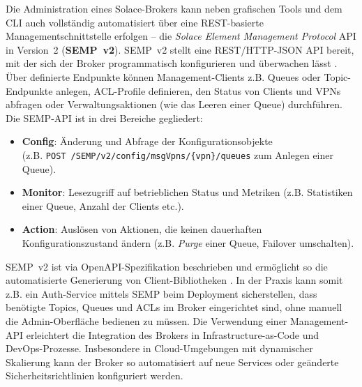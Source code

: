Die Administration eines Solace-Brokers kann neben grafischen Tools und dem CLI auch vollständig automatisiert über eine REST-basierte Managementschnittstelle erfolgen – die \textit{Solace Element Management Protocol} API in Version 2 (\textbf{SEMP v2}). SEMP v2 stellt eine REST/HTTP-JSON API bereit, mit der sich der Broker programmatisch konfigurieren und überwachen lässt \cite{SolaceSEMP}. Über definierte Endpunkte können Management-Clients z.B. Queues oder Topic-Endpunkte anlegen, ACL-Profile definieren, den Status von Clients und VPNs abfragen oder Verwaltungsaktionen (wie das Leeren einer Queue) durchführen. Die SEMP-API ist in drei Bereiche gegliedert: \begin{itemize}\setlength\itemsep{0pt} \item \textbf{Config}: Änderung und Abfrage der Konfigurationsobjekte \\(z.B. \verb|POST /SEMP/v2/config/msgVpns/{vpn}/queues| zum Anlegen einer Queue). \item \textbf{Monitor}: Lesezugriff auf betrieblichen Status und Metriken (z.B. Statistiken einer Queue, Anzahl der Clients etc.). \item \textbf{Action}: Auslösen von Aktionen, die keinen dauerhaften Konfigurationszustand ändern (z.B. \textit{Purge} einer Queue, Failover umschalten). \end{itemize} SEMP v2 ist via OpenAPI-Spezifikation beschrieben und ermöglicht so die automatisierte Generierung von Client-Bibliotheken \cite{SolaceSEMP}. In der Praxis kann somit z.B. ein Auth-Service mittels SEMP beim Deployment sicherstellen, dass benötigte Topics, Queues und ACLs im Broker eingerichtet sind, ohne manuell die Admin-Oberfläche bedienen zu müssen. Die Verwendung einer Management-API erleichtert die Integration des Brokers in Infrastructure-as-Code und DevOps-Prozesse. Insbesondere in Cloud-Umgebungen mit dynamischer Skalierung kann der Broker so automatisiert auf neue Services oder geänderte Sicherheitsrichtlinien konfiguriert werden.

